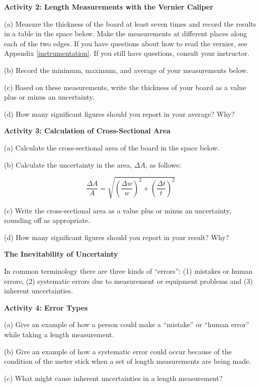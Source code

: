 \textbf{Activity 2: Length Measurements with the Vernier Caliper }

(a) Measure the thickness of the board at least seven times and record the results
in a table in the space below. Make the measurements at different places along
each of the two edges. If you have questions about how to read the vernier,
see Appendix \ref{instrumentation}. If you still have questions, consult your instructor.
\vspace{25mm}

(b) Record the minimum, maximum, and average of your measurements below.
\vspace{20mm}

(c) Based on these measurements, write the thickness of your board as a value plus or minus an uncertainty.
\vspace{15mm}

(d) How many significant figures should you report in your average? Why? 
\vspace{15mm}

\textbf{Activity 3: Calculation of Cross-Sectional Area} 

(a) Calculate the cross-sectional area of the board in the space below.
\vspace{15mm}

(b) Calculate the uncertainty in the area, \( \Delta  A\), as follows:

   $$ \frac{\Delta A}{A} = \sqrt{\left(\frac{\Delta w}{w}\right)^2 + \left(\frac{\Delta t}{t}\right)^2}$$
\vspace{20mm}

(c) Write the cross-sectional area as a value plus or minus an uncertainty, rounding off as appropriate.
\vspace{15mm}

(d) How many significant figures should you report in your result? Why?
\vspace{15mm}

\textbf{The Inevitability of Uncertainty} 

In common terminology there are three kinds of ``errors'': (1)
mistakes or human errors, (2) systematic errors due to measurement or equipment
problems and (3) inherent uncertainties.

\textbf{Activity 4: Error Types} 

(a) Give an example of how a person could make a ``mistake''
or ``human error'' while taking a length measurement.
\vspace{15mm}

(b) Give an example of how a systematic error could occur because of the condition
of the meter stick when a set of length measurements are being made.
\vspace{20mm}

(c) What might cause inherent uncertainties in a length measurement?

